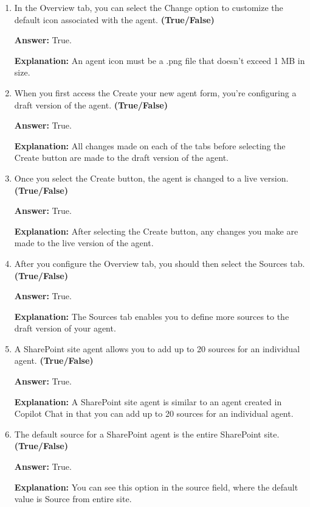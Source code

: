 \documentclass[10pt]{article}
\begin{document}
\begin{enumerate}[leftmargin=*]
\textbf{Answer:} True.

\textbf{Explanation:} Default values are provided for each field, but you can change them if you wish.

\item In the Overview tab, you can select the Change option to customize the default icon associated with the agent. \textbf{(True/False)}

\textbf{Answer:} True.

\textbf{Explanation:} An agent icon must be a .png file that doesn't exceed 1 MB in size.

\item When you first access the Create your new agent form, you're configuring a draft version of the agent. \textbf{(True/False)}

\textbf{Answer:} True.

\textbf{Explanation:} All changes made on each of the tabs before selecting the Create button are made to the draft version of the agent.

\item Once you select the Create button, the agent is changed to a live version. \textbf{(True/False)}

\textbf{Answer:} True.

\textbf{Explanation:} After selecting the Create button, any changes you make are made to the live version of the agent.

\item After you configure the Overview tab, you should then select the Sources tab. \textbf{(True/False)}

\textbf{Answer:} True.

\textbf{Explanation:} The Sources tab enables you to define more sources to the draft version of your agent.

\item A SharePoint site agent allows you to add up to 20 sources for an individual agent. \textbf{(True/False)}

\textbf{Answer:} True.

\textbf{Explanation:} A SharePoint site agent is similar to an agent created in Copilot Chat in that you can add up to 20 sources for an individual agent.

\item The default source for a SharePoint agent is the entire SharePoint site. \textbf{(True/False)}

\textbf{Answer:} True.

\textbf{Explanation:} You can see this option in the source field, where the default value is Source from entire site.


\end{enumerate}
\end{document}
